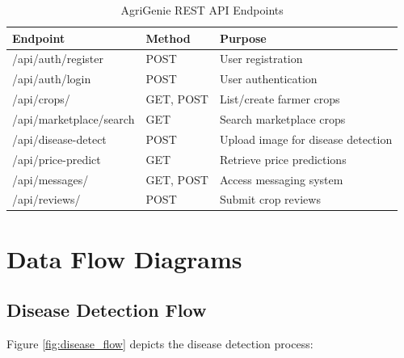 \documentclass[12pt,a4paper]{report}
\begin{document}
\begin{table}[H]
\centering
\caption{AgriGenie REST API Endpoints}
\label{table:api_endpoints}
\begin{tabular}{|l|l|l|}
\hline
\textbf{Endpoint} & \textbf{Method} & \textbf{Purpose} \\
\hline
/api/auth/register & POST & User registration \\
\hline
/api/auth/login & POST & User authentication \\
\hline
/api/crops/ & GET, POST & List/create farmer crops \\
\hline
/api/marketplace/search & GET & Search marketplace crops \\
\hline
/api/disease-detect & POST & Upload image for disease detection \\
\hline
/api/price-predict & GET & Retrieve price predictions \\
\hline
/api/messages/ & GET, POST & Access messaging system \\
\hline
/api/reviews/ & POST & Submit crop reviews \\
\hline
\end{tabular}
\end{table}

\section{Data Flow Diagrams}

\subsection{Disease Detection Flow}

Figure \ref{fig:disease_flow} depicts the disease detection process:
\end{document}
